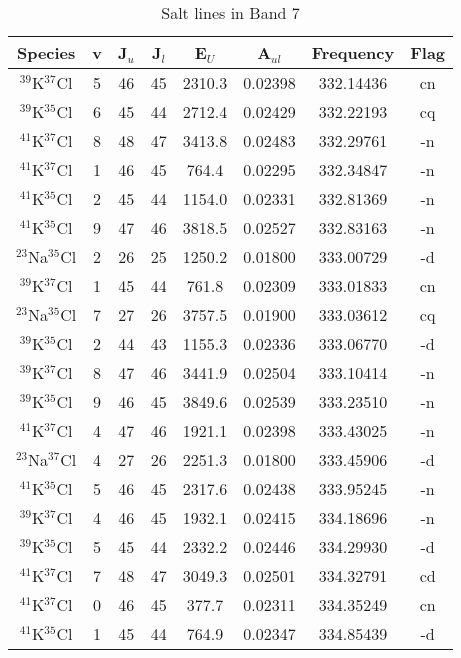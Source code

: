 \begin{table*}[htp]
\centering
\caption{Salt lines in Band 7}
\begin{tabular}{cccccccc}
\label{tab:all_detections_B7}
Species & v & J$_u$ & J$_l$ & E$_U$ & A$_{ul}$ & Frequency & Flag \\
\hline
$^{39}$K$^{37}$Cl & 5 & 46 & 45 & 2310.3 & 0.02398 & 332.14436 & cn \\
$^{39}$K$^{35}$Cl & 6 & 45 & 44 & 2712.4 & 0.02429 & 332.22193 & cq \\
$^{41}$K$^{37}$Cl & 8 & 48 & 47 & 3413.8 & 0.02483 & 332.29761 & -n \\
$^{41}$K$^{37}$Cl & 1 & 46 & 45 & 764.4 & 0.02295 & 332.34847 & -n \\
$^{41}$K$^{35}$Cl & 2 & 45 & 44 & 1154.0 & 0.02331 & 332.81369 & -n \\
$^{41}$K$^{35}$Cl & 9 & 47 & 46 & 3818.5 & 0.02527 & 332.83163 & -n \\
$^{23}$Na$^{35}$Cl & 2 & 26 & 25 & 1250.2 & 0.01800 & 333.00729 & -d \\
$^{39}$K$^{37}$Cl & 1 & 45 & 44 & 761.8 & 0.02309 & 333.01833 & cn \\
$^{23}$Na$^{35}$Cl & 7 & 27 & 26 & 3757.5 & 0.01900 & 333.03612 & cq \\
$^{39}$K$^{35}$Cl & 2 & 44 & 43 & 1155.3 & 0.02336 & 333.06770 & -d \\
$^{39}$K$^{37}$Cl & 8 & 47 & 46 & 3441.9 & 0.02504 & 333.10414 & -n \\
$^{39}$K$^{35}$Cl & 9 & 46 & 45 & 3849.6 & 0.02539 & 333.23510 & -n \\
$^{41}$K$^{37}$Cl & 4 & 47 & 46 & 1921.1 & 0.02398 & 333.43025 & -n \\
$^{23}$Na$^{37}$Cl & 4 & 27 & 26 & 2251.3 & 0.01800 & 333.45906 & -d \\
$^{41}$K$^{35}$Cl & 5 & 46 & 45 & 2317.6 & 0.02438 & 333.95245 & -n \\
$^{39}$K$^{37}$Cl & 4 & 46 & 45 & 1932.1 & 0.02415 & 334.18696 & -n \\
$^{39}$K$^{35}$Cl & 5 & 45 & 44 & 2332.2 & 0.02446 & 334.29930 & -d \\
$^{41}$K$^{37}$Cl & 7 & 48 & 47 & 3049.3 & 0.02501 & 334.32791 & cd \\
$^{41}$K$^{37}$Cl & 0 & 46 & 45 & 377.7 & 0.02311 & 334.35249 & cn \\
$^{41}$K$^{35}$Cl & 1 & 45 & 44 & 764.9 & 0.02347 & 334.85439 & -d \\

\end{tabular}
\end{table*}
